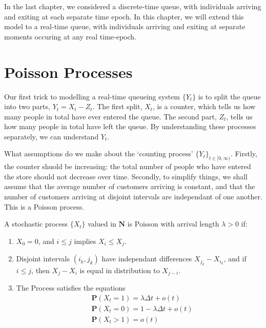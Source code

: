 In the last chapter, we considered a discrete-time queue, with individuals arriving and exiting at each separate time epoch. In this chapter, we will extend this model to a real-time queue, with individuals arriving and exiting at separate moments occuring at any real time-epoch.

\section{Poisson Processes}

Our first trick to modelling a real-time queueing system $\{ Y_t \}$ is to split the queue into two parts, $Y_t = X_t - Z_t$. The first split, $X_t$, is a counter, which tells us how many people in total have ever entered the queue. The second part, $Z_t$, tells us how many people in total have left the queue. By understanding these processes separately, we can understand $Y_t$.

What assumptions do we make about the `counting process' $\{ Y_t \}_{t \in [0,\infty)}$. Firstly, the counter shuold be increasing: the total number of people who have entered the store should not decrease over time. Secondly, to simplify things, we shall assume that the average number of customers arriving is constant, and that the number of customers arriving at disjoint intervals are independant of one another. This is a Poisson process.

\begin{definition}
    A stochastic process $\{ X_t \}$ valued in $\mathbf{N}$ is Poisson with arrival length $\lambda > 0$ if:
    \begin{enumerate}
        \item $X_0 = 0$, and $i \leq j$ implies $X_i \leq X_j$.
        \item Disjoint intervals $(i_k, j_k)$ have independant differences $X_{j_k} - X_{i_k}$, and if $i \leq j$, then $X_j - X_i$ is equal in distribution to $X_{j-i}$.
        \item The Process satisfies the equations
        \begin{align}
            &\label{posson1} \mathbf{P}(X_t = 1) = \lambda \Delta t + o(t)\\
            &\label{poisson2} \mathbf{P}(X_t = 0) = 1 - \lambda \Delta t + o(t)\\
            &\label{poisson3} \mathbf{P}(X_t > 1) = o(t)
        \end{align}
    \end{enumerate}
\end{definition}

